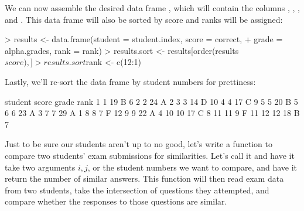 \documentclass[10pt, oneside, reqno]{article}
\theoremstyle{plain}
\begin{document}
\begin{Schunk}
\end{Schunk}

We can now assemble the desired data frame \verb@results@, which will contain the columns \verb@student@, \verb@score@, \verb@grade@, and \verb@rank@. This data frame will also be sorted by score and ranks will be assigned:

\begin{Schunk}
\begin{Sinput}
> results <- data.frame(student = student.index, score = correct, 
+     grade = alpha.grades, rank = rank)
> results.sort <- results[order(results$score), ]
> results.sort$rank <- c(12:1)
\end{Sinput}
\end{Schunk}

Lastly, we'll re-sort the data frame by student numbers for prettiness:
\begin{Schunk}
\begin{Soutput}
   student score grade rank
1        1    19     B    6
2        2    24     A    2
3        3    14     D   10
4        4    17     C    9
5        5    20     B    5
6        6    23     A    3
7        7    29     A    1
8        8     7     F   12
9        9    22     A    4
10      10    17     C    8
11      11     9     F   11
12      12    18     B    7
\end{Soutput}
\end{Schunk}

Just to be sure our students aren't up to no good, let's write a function to compare two students' exam submissions for similarities. Let's call it \verb@cheaterkiller@ and have it take two arguments $i,j$, or the student numbers we want to compare, and have it return the number of similar answers. This function will then read exam data from two students, take the intersection of questions they attempted, and compare whether the responses to those questions are similar.
\end{document}
